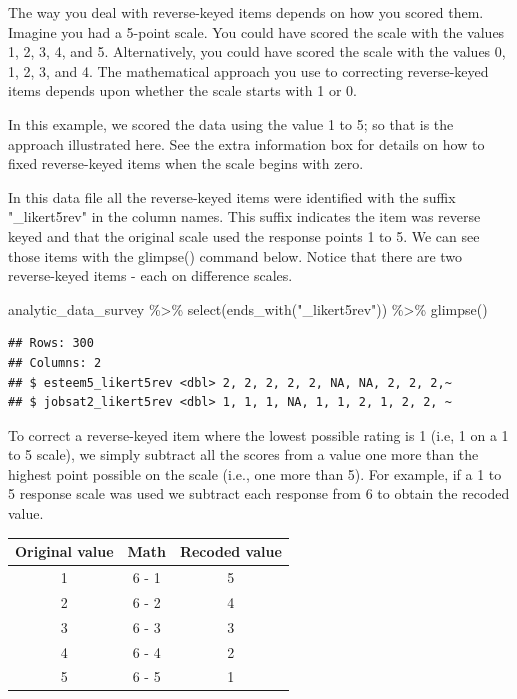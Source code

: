 \documentclass[
]{krantz}
\makeatletter
\newenvironment{Shaded}{\begin{snugshade}}{\end{snugshade}}
\newcommand{\FunctionTok}[1]{\textcolor[rgb]{0,0,0}{#1}}
\newcommand{\NormalTok}[1]{#1}
\newcommand{\SpecialCharTok}[1]{\textcolor[rgb]{0,0,0}{#1}}
\newcommand{\StringTok}[1]{\textcolor[rgb]{0.5,0.5,0.5}{#1}}
\newenvironment{kframe}{%
\medskip{}
\setlength{\fboxsep}{.8em}
 \def\at@end@of@kframe{}%
 \ifinner\ifhmode%
  \def\at@end@of@kframe{\end{minipage}}%
  \begin{minipage}{\columnwidth}%
 \fi\fi%
 \def\FrameCommand##1{\hskip\@totalleftmargin \hskip-\fboxsep
 \colorbox{shadecolor}{##1}\hskip-\fboxsep
     \hskip-\linewidth \hskip-\@totalleftmargin \hskip\columnwidth}%
 \MakeFramed {\advance\hsize-\width
   \@totalleftmargin\z@ \linewidth\hsize
   \@setminipage}}%
 {\par\unskip\endMakeFramed%
 \at@end@of@kframe}
\renewenvironment{Shaded}{\begin{kframe}}{\end{kframe}}
\makeatother
\begin{document}
The way you deal with reverse-keyed items depends on how you scored them. Imagine you had a 5-point scale. You could have scored the scale with the values 1, 2, 3, 4, and 5. Alternatively, you could have scored the scale with the values 0, 1, 2, 3, and 4. The mathematical approach you use to correcting reverse-keyed items depends upon whether the scale starts with 1 or 0.

In this example, we scored the data using the value 1 to 5; so that is the approach illustrated here. See the extra information box for details on how to fixed reverse-keyed items when the scale begins with zero.

In this data file all the reverse-keyed items were identified with the suffix "\_likert5rev" in the column names. This suffix indicates the item was reverse keyed and that the original scale used the response points 1 to 5. We can see those items with the glimpse() command below. Notice that there are two reverse-keyed items - each on difference scales.

\begin{Shaded}
\begin{Highlighting}[]
\NormalTok{analytic\_data\_survey }\SpecialCharTok{\%\textgreater{}\%}
  \FunctionTok{select}\NormalTok{(}\FunctionTok{ends\_with}\NormalTok{(}\StringTok{"\_likert5rev"}\NormalTok{)) }\SpecialCharTok{\%\textgreater{}\%}
  \FunctionTok{glimpse}\NormalTok{()}
\end{Highlighting}
\end{Shaded}

\begin{verbatim}
## Rows: 300
## Columns: 2
## $ esteem5_likert5rev <dbl> 2, 2, 2, 2, 2, NA, NA, 2, 2, 2,~
## $ jobsat2_likert5rev <dbl> 1, 1, 1, NA, 1, 1, 2, 1, 2, 2, ~
\end{verbatim}

To correct a reverse-keyed item where the lowest possible rating is 1 (i.e, 1 on a 1 to 5 scale), we simply subtract all the scores from a value one more than the highest point possible on the scale (i.e., one more than 5). For example, if a 1 to 5 response scale was used we subtract each response from 6 to obtain the recoded value.

\begin{longtable}[]{@{}ccc@{}}
\toprule
Original value & Math & Recoded value \\
\midrule
\endhead
1 & 6 - 1 & 5 \\
2 & 6 - 2 & 4 \\
3 & 6 - 3 & 3 \\
4 & 6 - 4 & 2 \\
5 & 6 - 5 & 1 \\
\bottomrule
\end{longtable}
\end{document}
